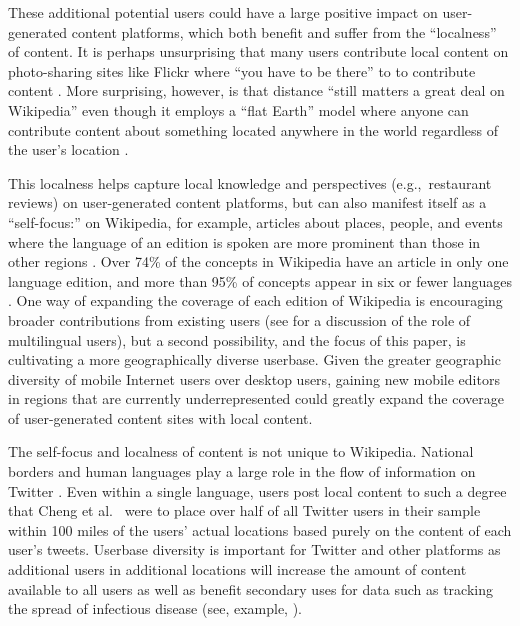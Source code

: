 \documentclass{sigchi}
\newcommand{\eg}{e.g.,~\ignorespaces}
\begin{document}
These additional potential users could have a large positive impact on user-generated content platforms, which both benefit and suffer from the ``localness'' of content. It is perhaps unsurprising that many users contribute local content on photo-sharing sites like Flickr where ``you have to be there'' to to contribute content \cite{hecht2010-localness}. More surprising, however, is that distance ``still matters a great deal on Wikipedia'' even though it employs a ``flat Earth'' model where anyone can contribute content about something located anywhere in the world regardless of the user's location \cite{hecht2010-localness}.

This localness helps capture local knowledge and perspectives (\eg restaurant reviews) on user-generated content platforms, but can also manifest itself as a ``self-focus:'' on Wikipedia, for example, articles about places, people, and events where the language of an edition is spoken are more prominent than those in other regions \cite{hecht2010}.
Over 74\% of the concepts in Wikipedia have an article in only one language edition, and more than 95\% of concepts appear in six or fewer languages \cite{hecht2010}.
One way of expanding the coverage of each edition of Wikipedia is encouraging broader contributions from existing users (see \cite{hale2014-wiki} for a discussion of the role of multilingual users), but a second possibility, and the focus of this paper, is cultivating a more geographically diverse userbase.
Given the greater geographic diversity of mobile Internet users over desktop users, gaining new mobile editors in regions that are currently underrepresented could greatly expand the coverage of user-generated content sites with local content.

The self-focus and localness of content is not unique to Wikipedia. National borders and human languages play a large role in the flow of information on Twitter \cite{hale-chi2014,mocanu2013}. Even within a single language, users post local content to such a degree that Cheng et al.~\cite{cheng2010-twitter-location} were to place over half of all Twitter users in their sample within 100 miles of the users' actual locations based purely on the content of each user's tweets. Userbase diversity is important for Twitter and other platforms as additional users in additional locations will increase the amount of content available to all users as well as benefit secondary uses for data such as tracking the spread of infectious disease (see, example, \cite{culotta2010,signorini2011}).
\end{document}
